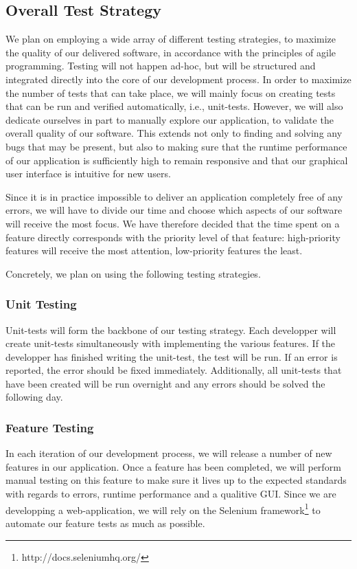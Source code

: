 \documentclass[10pt,a4paper,BCOR12mm, headexclude, footexclude,
  twoside, openright]{scrartcl} \usepackage[scaled]{helvet}
\numberwithin{equation}{section} %
\numberwithin{figure}{section} %
\numberwithin{table}{section} %
\begin{document}
\subsection{Overall Test Strategy}
We plan on employing a wide array of different testing strategies, to maximize
the quality of our delivered software, in accordance with the principles of
agile programming. Testing will not happen ad-hoc, but will be structured and
integrated directly into the core of our development process.  In order to
maximize the number of tests that can take place, we will mainly focus on
creating tests that can be run and verified automatically, i.e., unit-tests.
However, we will also dedicate ourselves in part to manually explore our
application, to validate the overall quality of our software. This extends not
only to finding and solving any bugs that may be present, but also to making
sure that the runtime performance of our application is sufficiently high to
remain responsive and that our graphical user interface is intuitive for new
users.

Since it is in practice impossible to deliver an application completely free of
any errors, we will have to divide our time and choose which aspects of our
software will receive the most focus. We have therefore decided that the time
spent on a feature directly corresponds with the priority level of that feature:
high-priority features will receive the most attention, low-priority features
the least.

Concretely, we plan on using the following testing strategies.

\subsubsection*{Unit Testing}
Unit-tests will form the backbone of our testing strategy. Each developper will
create unit-tests simultaneously with implementing the various features.  If the
developper has finished writing the unit-test, the test will be run. If an error
is reported, the error should be fixed immediately.  Additionally, all
unit-tests that have been created will be run overnight and any errors should be
solved the following day.

\subsubsection*{Feature Testing}
In each iteration of our development process, we will release a number of new
features in our application. Once a feature has been completed, we will perform
manual testing on this feature to make sure it lives up to the expected
standards with regards to errors, runtime performance and a qualitive GUI.
Since we are developping a web-application, we will rely on the Selenium
framework\footnote{http://docs.seleniumhq.org/} to automate our feature tests as
much as possible.
\end{document}
